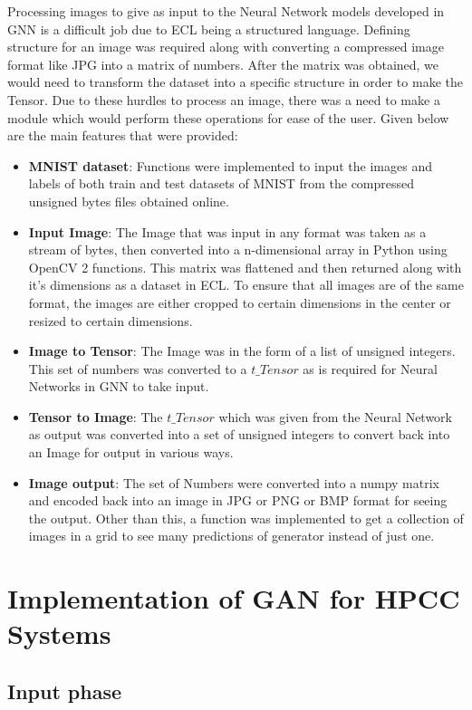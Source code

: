 \documentclass[conference]{IEEEtran}
\begin{document}
Processing images to give as input to the Neural Network models developed in GNN is a difficult job due to ECL being a structured language. Defining structure for an image was required along with converting a compressed image format like JPG into a matrix of numbers. After the matrix was obtained, we would need to transform the dataset into a specific structure in order to make the Tensor. Due to these hurdles to process an image, there was a need to make a module which would perform these operations for ease of the user. Given below are the main features that were provided:
\begin{itemize}
    \item \textbf{MNIST dataset}: Functions were implemented to input the images and labels of both train and test datasets of MNIST from the compressed unsigned bytes files obtained online\cite{mnistdat}.
    \item \textbf{Input Image}: The Image that was input in any format was taken as a stream of bytes, then converted into a n-dimensional array in Python using OpenCV 2 functions. This matrix was flattened and then returned along with it's dimensions as a dataset in ECL. To ensure that all images are of the same format, the images are either cropped to certain dimensions in the center or resized to certain dimensions. 
    \item \textbf{Image to Tensor}: The Image was in the form of a list of unsigned integers. This set of numbers was converted to a $t\_Tensor$ as is required for Neural Networks in GNN to take input. 
    \item \textbf{Tensor to Image}: The $t\_Tensor$ which was given from the Neural Network as output was converted into a set of unsigned integers to convert back into an Image for output in various ways.
    \item \textbf{Image output}: The set of Numbers were converted into a numpy matrix and encoded back into an image in JPG or PNG or BMP format for seeing the output. Other than this, a function was implemented to get a collection of images in a grid to see many predictions of generator instead of just one. 
\end{itemize}

\section{Implementation of GAN for HPCC Systems}\label{implementation}

\subsection{Input phase}
\end{document}
